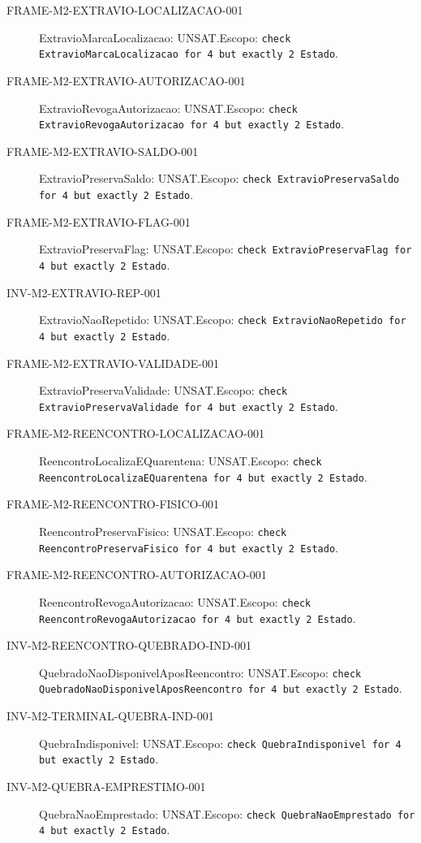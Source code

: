 \begin{description}
\item[FRAME-M2-EXTRAVIO-LOCALIZACAO-001] ExtravioMarcaLocalizacao: UNSAT.\newline Escopo: \texttt{check ExtravioMarcaLocalizacao for 4 but exactly 2 Estado}.
\item[FRAME-M2-EXTRAVIO-AUTORIZACAO-001] ExtravioRevogaAutorizacao: UNSAT.\newline Escopo: \texttt{check ExtravioRevogaAutorizacao for 4 but exactly 2 Estado}.
\item[FRAME-M2-EXTRAVIO-SALDO-001] ExtravioPreservaSaldo: UNSAT.\newline Escopo: \texttt{check ExtravioPreservaSaldo for 4 but exactly 2 Estado}.
\item[FRAME-M2-EXTRAVIO-FLAG-001] ExtravioPreservaFlag: UNSAT.\newline Escopo: \texttt{check ExtravioPreservaFlag for 4 but exactly 2 Estado}.
\item[INV-M2-EXTRAVIO-REP-001] ExtravioNaoRepetido: UNSAT.\newline Escopo: \texttt{check ExtravioNaoRepetido for 4 but exactly 2 Estado}.
\item[FRAME-M2-EXTRAVIO-VALIDADE-001] ExtravioPreservaValidade: UNSAT.\newline Escopo: \texttt{check ExtravioPreservaValidade for 4 but exactly 2 Estado}.
\item[FRAME-M2-REENCONTRO-LOCALIZACAO-001] ReencontroLocalizaEQuarentena: UNSAT.\newline Escopo: \texttt{check ReencontroLocalizaEQuarentena for 4 but exactly 2 Estado}.
\item[FRAME-M2-REENCONTRO-FISICO-001] ReencontroPreservaFisico: UNSAT.\newline Escopo: \texttt{check ReencontroPreservaFisico for 4 but exactly 2 Estado}.
\item[FRAME-M2-REENCONTRO-AUTORIZACAO-001] ReencontroRevogaAutorizacao: UNSAT.\newline Escopo: \texttt{check ReencontroRevogaAutorizacao for 4 but exactly 2 Estado}.
\item[INV-M2-REENCONTRO-QUEBRADO-IND-001] QuebradoNaoDisponivelAposReencontro: UNSAT.\newline Escopo: \texttt{check QuebradoNaoDisponivelAposReencontro for 4 but exactly 2 Estado}.
\item[INV-M2-TERMINAL-QUEBRA-IND-001] QuebraIndisponivel: UNSAT.\newline Escopo: \texttt{check QuebraIndisponivel for 4 but exactly 2 Estado}.
\item[INV-M2-QUEBRA-EMPRESTIMO-001] QuebraNaoEmprestado: UNSAT.\newline Escopo: \texttt{check QuebraNaoEmprestado for 4 but exactly 2 Estado}.

\end{description}
